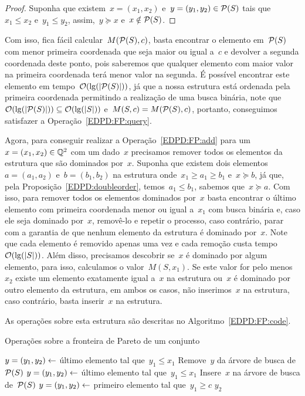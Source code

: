 \begin{proof}
Suponha que existem~$x = (x_1,x_2)$ e~$y = (y_1,y_2) \in \mathcal{P}(S)$ tais que~$x_1 \leq x_2$ e~$y_1 \leq y_2$, assim,~$y \succeq x$ e~$x \notin \mathcal{P}(S)$.
\end{proof}

Com isso, fica fácil calcular~$M(\mathcal{P}(S),c)$, basta encontrar o elemento em~$\mathcal{P}(S)$ com menor primeira coordenada que seja maior ou igual a~$c$ e devolver a segunda coordenada deste ponto, pois saberemos que qualquer elemento com maior valor na primeira coordenada terá menor valor na segunda. É possível encontrar este elemento em tempo~$\mathcal{O}(\lg(|\mathcal{P}(S)|))$, já que a nossa estrutura está ordenada pela primeira coordenada permitindo a realização de uma busca binária, note que~${\mathcal{O}(\lg(|\mathcal{P}(S)|)) \subseteq \mathcal{O}(\lg(|S|))}$ e~$M(S,c) = M(\mathcal{P}(S),c)$, portanto, conseguimos satisfazer a Operação~\ref{EDPD:FP:query}.


Agora, para conseguir realizar a Operação~\ref{EDPD:FP:add} para um~$x = (x_1,x_2) \in \mathbb{Q}^2$ com um dado~$x$ precisamos remover todos os elementos da estrutura que são dominados por~$x$. Suponha que existem dois elementos~$a = (a_1,a_2)$ e~$b = (b_1,b_2)$ na estrutura onde~$x_1 \geq a_1 \geq b_1$ e~$x \succeq b$, já que, pela Proposição~\ref{EDPD:doubleorder}, temos~$a_1 \leq b_1$, sabemos que~$x \succeq a$. Com isso, para remover todos os elementos dominados por~$x$ basta encontrar o último elemento com primeira coordenada menor ou igual a~$x_1$ com busca binária e, caso ele seja dominado por~$x$, removê-lo e repetir o processo, caso contrário, parar com a garantia de que nenhum elemento da estrutura é dominado por~$x$. Note que cada elemento é removido apenas uma vez e cada remoção custa tempo~$\mathcal{O}(\lg(|S|))$. Além disso, precisamos descobrir se~$x$ é dominado por algum elemento, para isso, calculamos o valor~$M(S,x_1)$. Se este valor for pelo menos~$x_2$ existe um elemento exatamente igual a~$x$ na estrutura ou~$x$ é dominado por outro elemento da estrutura, em ambos os casos, não inserimos~$x$ na estrutura, caso contrário, basta inserir~$x$ na estrutura.

As operações sobre esta estrutura são descritas no Algoritmo~\ref{EDPD:FP:code}.

\begin{algorithm}[h]
\caption{Operações sobre a fronteira de Pareto de um conjunto}
\label{EDPD:FP:code}
\begin{algorithmic}[1]
    \State $y = (y_1,y_2) \leftarrow$ último elemento tal que~$y_1 \leq x_1$
        \State Remove~$y$ da árvore de busca de~$\mathcal{P}(S)$
        \State $y = (y_1,y_2) \leftarrow$ último elemento tal que~$y_1 \leq x_1$
    \EndWhile
        \State Insere~$x$ na árvore de busca de~$\mathcal{P}(S)$
    \EndIf
\EndFunction
{}
    \State $y = (y_1,y_2) \leftarrow$ primeiro elemento tal que~$y_1 \geq c$
    \State \Return $y_2$
\EndFunction
\end{algorithmic}
\end{algorithm}


